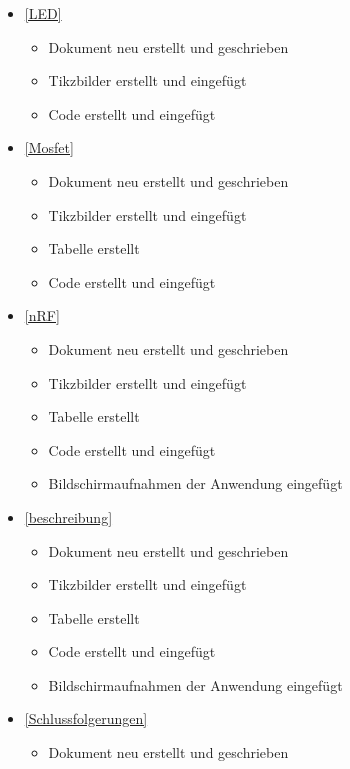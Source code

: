 \begin{itemize}
 	 	\item {}\ref{LED}
 	\begin{itemize}
 		\item Dokument neu erstellt und geschrieben
 		\item Tikzbilder erstellt und eingefügt
 		\item Code erstellt und eingefügt
 	\end{itemize}
 	
 	 	 \item {}\ref{Mosfet}
 	\begin{itemize}
 		\item Dokument neu erstellt und geschrieben
 		\item Tikzbilder erstellt und eingefügt
 		\item Tabelle erstellt
 		\item Code erstellt und eingefügt
 	\end{itemize}
 	
 	\item {}\ref{nRF}
 	\begin{itemize}
 		\item Dokument neu erstellt und geschrieben
 		\item Tikzbilder erstellt und eingefügt
 		\item Tabelle erstellt
 		\item Code erstellt und eingefügt
 		\item Bildschirmaufnahmen der Anwendung eingefügt
 	\end{itemize}
 	 	\item {}\ref{beschreibung}
 	\begin{itemize}
 		\item Dokument neu erstellt und geschrieben
 		\item Tikzbilder erstellt und eingefügt
 		\item Tabelle erstellt
 		\item Code erstellt und eingefügt
 		\item Bildschirmaufnahmen der Anwendung eingefügt
 	\end{itemize}
 	
 	
 	 	\item {}\ref{Schlussfolgerungen}
 	\begin{itemize}
 		\item Dokument neu erstellt und geschrieben
 	\end{itemize}
 	

\end{itemize}
